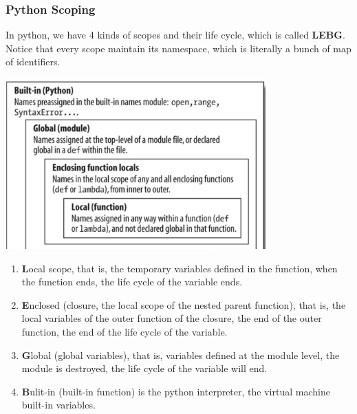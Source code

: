 \documentclass[a4paper]{exam}
\theoremstyle{definition}
\begin{document}
\subsubsection{Python Scoping}

In python, we have 4 kinds of scopes and their life cycle, which is called \textbf{LEBG}. Notice that every scope maintain its namespace, which is literally a bunch of map of identifiers.

\includegraphics[width=10cm]{img/Snipaste_2021-04-24_02-41-32.png}
\begin{enumerate}
  \item \textbf{L}ocal scope,  that is, the temporary variables defined in the function, when the function ends, the life cycle of the variable ends.

  \item \textbf{E}nclosed (closure, the local scope of the nested parent function), that is, the local variables of the outer function of the closure, the end of the outer function, the end of the life cycle of the variable.
  \item \textbf{G}lobal (global variables), that is, variables defined at the module level, the module is destroyed, the life cycle of the variable will end.
  \item \textbf{B}ulit-in (built-in function) is the python interpreter, the virtual machine built-in variables.
\end{enumerate}
\end{document}
